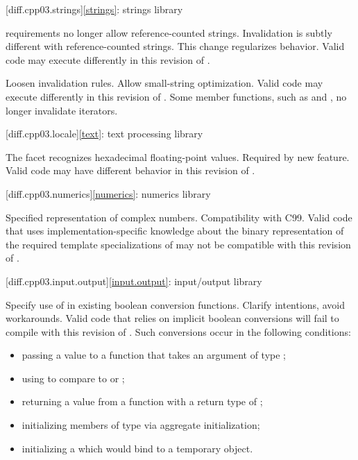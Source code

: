 [diff.cpp03.strings]{\ref*{strings}: strings library}

\change
{} requirements no longer allow reference-counted
strings.
\rationale
Invalidation is subtly different with reference-counted strings.
This change regularizes behavior.
\effect
Valid \CppIII{} code may execute differently in this revision of \Cpp{}.

\change
Loosen  invalidation rules.
\rationale
Allow small-string optimization.
\effect
Valid \CppIII{} code may execute differently in this revision of \Cpp{}.
Some  member functions, such as  and ,
no longer invalidate iterators.

[diff.cpp03.locale]{\ref*{text}: text processing library}

\change
The  facet recognizes hexadecimal floating-point values.
\rationale
Required by new feature.
\effect
Valid \CppIII{} code may have different behavior in this revision of \Cpp{}.

[diff.cpp03.numerics]{\ref*{numerics}: numerics library}

\change
Specified representation of complex numbers.
\rationale
Compatibility with C99.
\effect
Valid \CppIII{} code that uses implementation-specific knowledge about the
binary representation of the required template specializations of
 may not be compatible with this revision of \Cpp{}.

[diff.cpp03.input.output]{\ref*{input.output}: input/output library}

\change
Specify use of  in existing boolean conversion functions.
\rationale
Clarify intentions, avoid workarounds.
\effect
Valid \CppIII{} code that relies on implicit boolean conversions will fail to
compile with this revision of \Cpp{}. Such conversions occur in the
following conditions:

\begin{itemize}
\item passing a value to a function that takes an argument of type ;
\item using  to compare to  or ;
\item returning a value from a function with a return type of ;
\item initializing members of type  via aggregate initialization;
\item initializing a  which would bind to a temporary object.
\end{itemize}

